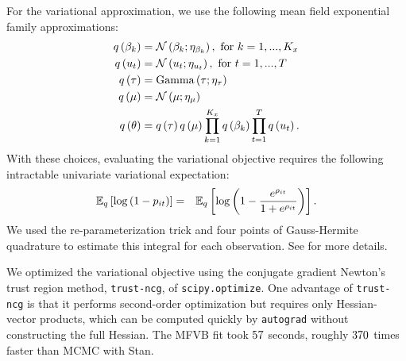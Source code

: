 \documentclass{article}\usepackage[]{graphicx}\usepackage[]{color}
\theoremstyle{plain}
\theoremstyle{definition}
\theoremstyle{plain}
\theoremstyle{plain}
\theoremstyle{plain}
\theoremstyle{plain}
\begin{document}
For the variational approximation, we use the following mean field
exponential family approximations:
\begin{align*}
q\left(\beta_{k}\right) & =\mathcal{N}\left(\beta_{k};\eta_{\beta_{k}}\right),\textrm{ for }k=1,...,K_{x}\\
q\left(u_{t}\right) & =\mathcal{N}\left(u_{t};\eta_{u_{t}}\right),\textrm{ for }t=1,...,T\\
q\left(\tau\right) & =\textrm{Gamma}\left(\tau;\eta_{\tau}\right)\\
q\left(\mu\right) & =\mathcal{N}\left(\mu;\eta_{\mu}\right)\\
q\left(\theta\right) & =q\left(\tau\right)q\left(\mu\right)\prod_{k=1}^{K_{x}}q\left(\beta_{k}\right)\prod_{t=1}^{T}q\left(u_{t}\right).
\end{align*}
With these choices, evaluating the variational objective requires
the following intractable univariate variational expectation:
\begin{eqnarray*}
\mathbb{E}_{q}\left[\log\left(1-p_{it}\right)\right] & = & \mathbb{E}_{q}\left[\log\left(1-\frac{e^{\rho_{it}}}{1+e^{\rho_{it}}}\right)\right].
\end{eqnarray*}
We used the re-parameterization trick and four points of Gauss-Hermite
quadrature to estimate this integral for each observation. See 
for more details.

We optimized the variational objective using the conjugate gradient
Newton's trust region method, \texttt{trust-ncg}, of \texttt{scipy.optimize}.
One advantage of \texttt{trust-ncg} is that it performs second-order
optimization but requires only Hessian-vector products, which can
be computed quickly by \texttt{autograd} without constructing the
full Hessian. The MFVB fit took $57$ seconds, roughly $370$
times faster than MCMC with Stan.
\end{document}
